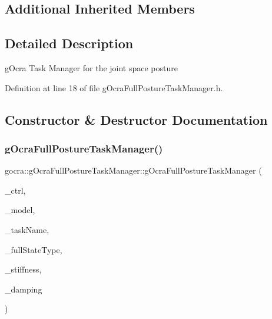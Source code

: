 \subsection*{Additional Inherited Members}


\subsection{Detailed Description}
g\+Ocra Task Manager for the joint space posture 



Definition at line 18 of file g\+Ocra\+Full\+Posture\+Task\+Manager.\+h.



\subsection{Constructor \& Destructor Documentation}
\hypertarget{classgocra_1_1gOcraFullPostureTaskManager_a71c039da046e968235f40e53838018c0}{}\label{classgocra_1_1gOcraFullPostureTaskManager_a71c039da046e968235f40e53838018c0} 
\subsubsection{\texorpdfstring{g\+Ocra\+Full\+Posture\+Task\+Manager()}{gOcraFullPostureTaskManager()}\hspace{0.1cm}{\footnotesize\ttfamily [1/2]}}
{\footnotesize\ttfamily gocra\+::g\+Ocra\+Full\+Posture\+Task\+Manager\+::g\+Ocra\+Full\+Posture\+Task\+Manager (\begin{DoxyParamCaption}\item[{\hyperlink{classgocra_1_1GHCJTController}{G\+H\+C\+J\+T\+Controller} \&}]{\+\_\+ctrl,  }\item[{const \hyperlink{classocra_1_1Model}{ocra\+::\+Model} \&}]{\+\_\+model,  }\item[{const std\+::string \&}]{\+\_\+task\+Name,  }\item[{int}]{\+\_\+full\+State\+Type,  }\item[{double}]{\+\_\+stiffness,  }\item[{double}]{\+\_\+damping }\end{DoxyParamCaption})}

